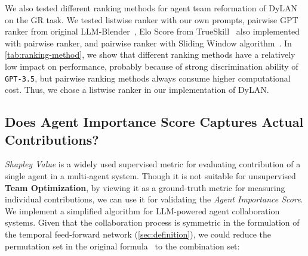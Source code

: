 \documentclass{article} %
\begin{document}
\begin{table}
    \vspace{-25pt}
    \small
    \caption{Overall accuracy (\%) of DyLAN with different ranking method in the agent team reformation on the GR task. Other settings are identical with \cref{tab:mmlu}.}
    \label{tab:ranking-method}
\end{table}

We also tested different ranking methods for agent team reformation of DyLAN on the GR task. We tested listwise ranker with our own prompts, pairwise GPT ranker from original LLM-Blender~\citep{blender}, Elo Score from TrueSkill~\citep{trueskill} also implemented with pairwise ranker, and pairwise ranker with Sliding Window algorithm~\citep{sliding-window}. In \cref{tab:ranking-method}, we show that different ranking methods have a relatively low impact on performance, probably because of strong discrimination ability of \texttt{GPT-3.5}, but pairwise ranking methods always consume higher computational cost. Thus, we chose a listwise ranker in our implementation of DyLAN.

\vspace{-0.5em}
\subsection{Does Agent Importance Score Captures Actual Contributions?}\label{app:shap}

\vspace{-0.5em}

\textit{Shapley Value} is a widely used supervised metric for evaluating contribution of a single agent in a multi-agent system. Though it is not suitable for unsupervised \textbf{Team Optimization}, by viewing it as a ground-truth metric for measuring individual contributions, we can use it for validating the \textit{Agent Importance Score}. We implement a simplified algorithm for LLM-powered agent collaboration systems. Given that the collaboration process is symmetric in the formulation of the temporal feed-forward network (\cref{sec:definition}), we could reduce the permutation set in the original formula~\citep{SHAP} to the combination set:
\end{document}
